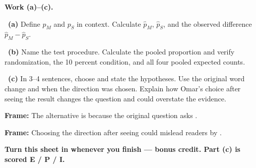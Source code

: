 \documentclass[11pt]{article}
\begin{document}
\newpage
\textbf{Work (a)--(c).}\par\smallskip

~\textbf{(a)} Define $p_M$ and $p_S$ in context. Calculate $\hat p_M$, $\hat p_S$, and the observed difference $\hat p_M-\hat p_S$.\par
\workspace{0.7in}

~\textbf{(b)} Name the test procedure. Calculate the pooled proportion and verify randomization, the 10 percent condition, and all four pooled expected counts.\par
\workspace{1.4in}

~\textbf{(c)} In 3--4 sentences, choose and state the hypotheses. Use the original word change and when the direction was chosen. Explain how Omar's choice after seeing the result changes the question and could overstate the evidence.\par
\workspace{2.0in}

\begin{sentenceframebox}\raggedright\textbf{Frame:} The alternative is \blank[1.6in] because the original question asks \blank[2.0in].\end{sentenceframebox}

\begin{sentenceframebox}\raggedright\textbf{Frame:} Choosing the direction after seeing \blank[1.2in] could mislead readers by \blank[2.5in].\end{sentenceframebox}

\textbf{Turn this sheet in whenever you finish --- bonus credit. Part (c) is scored E / P / I.}\par
\end{document}
